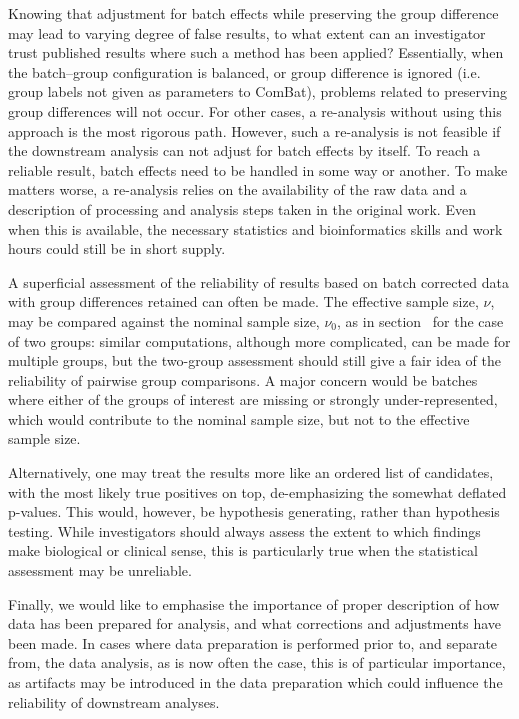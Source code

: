 \documentclass{bio}
\begin{document}
Knowing that adjustment for batch effects while preserving the group difference may lead to varying degree of false results, to what extent can an investigator trust published results where such a method has been applied? Essentially, when the batch--group configuration is balanced, or group difference is ignored  (i.e. group labels not given as parameters to ComBat), problems related to preserving group differences will not occur. For other cases, a re-analysis without using this approach is the most rigorous path. However, such a re-analysis is not feasible if the downstream  analysis can not adjust for batch effects by itself. To reach a reliable result, batch effects need to be handled in some way or another. To make matters worse, a re-analysis relies on the availability of the raw data and a description of processing and analysis steps taken in the original work. Even when this is available, the necessary statistics and bioinformatics skills and work hours could still be in short supply.

A superficial assessment of the reliability of results based on batch corrected data with group differences retained can often be made. The effective sample size, $\nu$, may be compared against the nominal sample size, $\nu_0$, as in section~\label{sec:twogroups} for the case of two groups: similar computations, although more complicated, can be made for multiple groups, but the two-group assessment should still give a fair idea of the reliability of pairwise group comparisons. A major concern would be batches where either of the groups of interest are missing or strongly under-represented, which would contribute to the nominal sample size, but not to the effective sample size.

Alternatively, one may treat the results more like an ordered list of candidates, with the most likely true positives on top, de-emphasizing the somewhat deflated p-values. This would, however, be hypothesis generating, rather than hypothesis testing. While investigators should always assess the extent to which findings make biological or clinical sense, this is particularly true when the statistical assessment may be unreliable.

Finally, we would like to emphasise the importance of proper description of how data has been prepared for analysis, and what corrections and adjustments have been made. In cases where data preparation is performed prior to, and separate from, the data analysis, as is now often the case, this is of particular importance, as artifacts may be introduced in the data preparation which could influence the reliability of downstream analyses.
\end{document}
